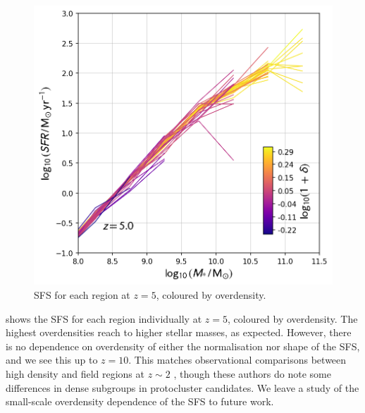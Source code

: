 \begin{figure}
	\includegraphics[width=\columnwidth]{images/sfs_overdensity.png}
    \caption{SFS for each region at $z = 5$, coloured by overdensity.
    }
    \label{fig:sfs_overdensity}
\end{figure}

 shows the SFS for each region individually at $z = 5$, coloured by overdensity.
The highest overdensities reach to higher stellar masses, as expected.
However, there is no dependence on overdensity of either the normalisation nor shape of the SFS, and we see this up to $z = 10$.
This matches observational comparisons between high density and field regions at $z \sim 2$
\citep{koyama_evolution_2013,koyama_environmental_2014,shimakawa_mahalo_2017,shimakawa_mahalo_2018}, though these authors do note some differences in dense subgroups in protocluster candidates.
We leave a study of the small-scale overdensity dependence of the SFS to future work.
